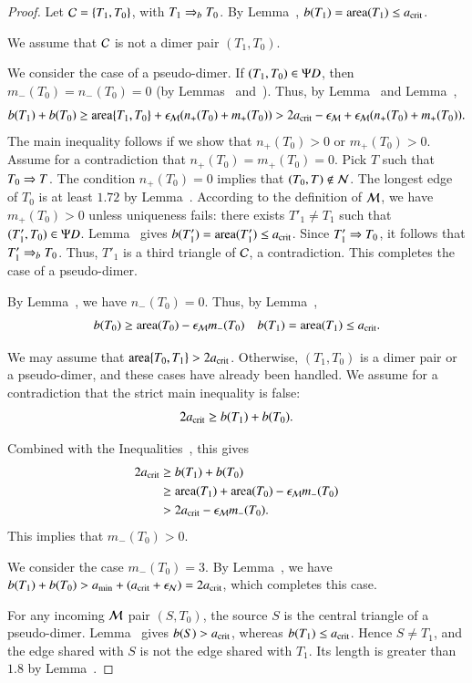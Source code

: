 \begin{proof}  
  Let $\mathcal C = \{T_1,T_0\}$, with $T_1\Rightarrow_{b} T_0$. By
  Lemma~, $b(T_1)={\operatorname{area}}(T_1)\le a_\text{crit}$.

  We assume that $\mathcal C$ is not a dimer pair $(T_1,T_0)$.

  We consider the case of a pseudo-dimer.  If $(T_1,T_0)\in\Psi D$, then
  $m_-(T_0)=n_-(T_0)=0$ (by Lemmas~
  and~).  Thus, by Lemma~ and
  Lemma~,
\[
b(T_1)+b(T_0) 
\ge {\operatorname{area}}\{T_1,T_0\} + \epsilon_{\mathcal M} (n_+(T_0) + m_+(T_0)) 
> 2a_\text{crit} - \epsilon_{\mathcal M}  + \epsilon_{\mathcal M} (n_+(T_0)+m_+(T_0)).
\]
The main inequality follows if we show that $n_+(T_0)>0$ or
$m_+(T_0)>0$.  Assume for a contradiction that $n_+(T_0)=m_+(T_0)=0$.
Pick $T$ such that $T_0\Rightarrow T$.  The condition $n_+(T_0)=0$ implies
that $(T_0,T)\not\in\mathcal N$.  The longest edge of $T_0$ is at least $1.72$
by Lemma~.  According to the definition of $\mathcal M$, we
have $m_+(T_0)>0$ unless uniqueness fails: there exists $T'_1\ne T_1$
such that $(T'_1,T_0)\in\Psi D$.  Lemma~ gives
$b(T'_1)={\operatorname{area}}(T'_1)\le a_\text{crit}$.  Since $T'_1\Rightarrow T_0$, it follows
that $T'_1\Rightarrow_{b} T_0$.  Thus, $T'_1$ is a third triangle of $\mathcal C$,
a contradiction.  This completes the case of a pseudo-dimer.

By Lemma~, we have $n_-(T_0)=0$.  Thus,
by Lemma~,
\begin{equation}\libel{eqn:2}
b(T_0) \ge \area(T_0)  - \epsM m_-(T_0)
\quad b(T_1) = \area(T_1) \le \acrit.
\end{equation}

We may assume that ${\operatorname{area}}\{T_0,T_1\}> 2a_\text{crit}$.  Otherwise,
$(T_1,T_0)$ is a dimer pair or a pseudo-dimer, and these cases have
already been handled.  We assume for a contradiction that the
strict main inequality is false:
\[
2a_\text{crit} \ge b(T_1) + b(T_0).
\]

Combined with the Inequalities~,
this gives
\begin{align*}
2a_\text{crit} &\ge b(T_1) + b(T_0) \\
&\ge {\operatorname{area}}(T_1) + {\operatorname{area}}(T_0)  - \epsilon_{\mathcal M} m_-(T_0)\\
&> 2a_\text{crit}  - \epsilon_{\mathcal M} m_-(T_0).
\end{align*}
This implies that  $m_-(T_0) > 0$.

We consider the case $m_-(T_0)= 3$.  By Lemma~, we have
$b(T_1) + b(T_0) > a_\text{min} + (a_\text{crit} + \epsilon_{\mathcal N}) = 2a_\text{crit}$, which completes
this case.

For any incoming $\mathcal M$ pair $(S,T_0)$, the source $S$ is the
central triangle of a pseudo-dimer.  Lemma~ gives
$b(S)>a_\text{crit}$, whereas $b(T_1)\le a_\text{crit}$.  Hence $S\ne T_1$,
and the edge shared with $S$ is not the edge shared with $T_1$.
Its length is greater than $1.8$ by Lemma~.


\end{proof}
